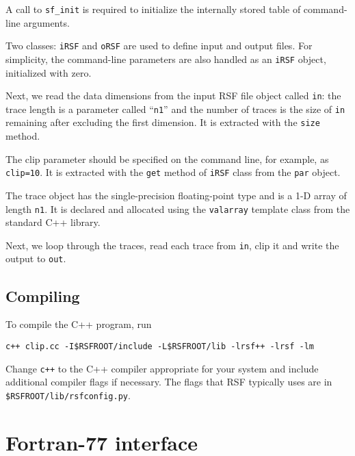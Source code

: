 
A call to \texttt{sf\_init} is required to initialize the internally stored
table of command-line arguments.


Two classes: \texttt{iRSF} and \texttt{oRSF} are used to define input and
output files. For simplicity, the command-line parameters are also handled 
as an \texttt{iRSF} object, initialized with zero.


Next, we read the data dimensions from the input RSF file object called
\texttt{in}: the trace length is a parameter called ``\texttt{n1}'' and the
number of traces is the size of \texttt{in} remaining after excluding the
first dimension. It is extracted with the \texttt{size} method.

 
The clip parameter should be specified on the command line, for
example, as \texttt{clip=10}. It is extracted with the \texttt{get}
method of \texttt{iRSF} class from the \texttt{par} object.


The trace object has the single-precision floating-point type and is a
1-D array of length \texttt{n1}. It is declared and allocated using
the \texttt{valarray} template class from the standard C++ library.


Next, we loop through the traces, read each trace from \texttt{in}, clip it
and write the output to \texttt{out}.

\subsection{Compiling}

To compile the C++ program, run
\begin{verbatim}
c++ clip.cc -I$RSFROOT/include -L$RSFROOT/lib -lrsf++ -lrsf -lm
\end{verbatim}
Change \texttt{c++} to the C++ compiler appropriate for your system and
include additional compiler flags if necessary. The flags that RSF typically
uses are in \texttt{\$RSFROOT/lib/rsfconfig.py}.

\section{Fortran-77 interface}

